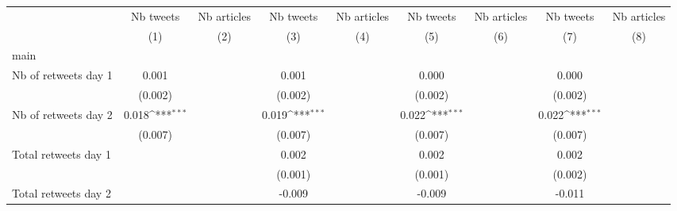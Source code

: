 {
\def\sym#1{\ifmmode^{#1}\else\(^{#1}\)\fi}
\begin{tabular}{l*{8}{c}}
\hline\hline
                    &\multicolumn{1}{c}{Nb tweets}&\multicolumn{1}{c}{Nb articles}&\multicolumn{1}{c}{Nb tweets}&\multicolumn{1}{c}{Nb articles}&\multicolumn{1}{c}{Nb tweets}&\multicolumn{1}{c}{Nb articles}&\multicolumn{1}{c}{Nb tweets}&\multicolumn{1}{c}{Nb articles}\\\cmidrule(lr){2-2}\cmidrule(lr){3-3}\cmidrule(lr){4-4}\cmidrule(lr){5-5}\cmidrule(lr){6-6}\cmidrule(lr){7-7}\cmidrule(lr){8-8}\cmidrule(lr){9-9}
                    &\multicolumn{1}{c}{(1)}         &\multicolumn{1}{c}{(2)}         &\multicolumn{1}{c}{(3)}         &\multicolumn{1}{c}{(4)}         &\multicolumn{1}{c}{(5)}         &\multicolumn{1}{c}{(6)}         &\multicolumn{1}{c}{(7)}         &\multicolumn{1}{c}{(8)}         \\
\hline
main                &                     &                     &                     &                     &                     &                     &                     &                     \\
Nb of retweets day 1&       0.001         &                     &       0.001         &                     &       0.000         &                     &       0.000         &                     \\
                    &     (0.002)         &                     &     (0.002)         &                     &     (0.002)         &                     &     (0.002)         &                     \\
Nb of retweets day 2&       0.018\sym{***}&                     &       0.019\sym{***}&                     &       0.022\sym{***}&                     &       0.022\sym{***}&                     \\
                    &     (0.007)         &                     &     (0.007)         &                     &     (0.007)         &                     &     (0.007)         &                     \\
Total retweets day 1&                     &                     &       0.002         &                     &       0.002         &                     &       0.002         &                     \\
                    &                     &                     &     (0.001)         &                     &     (0.001)         &                     &     (0.002)         &                     \\
Total retweets day 2&                     &                     &      -0.009         &                     &      -0.009         &                     &      -0.011         &                     \\

\end{tabular}}
